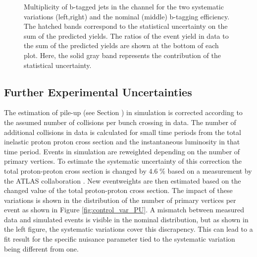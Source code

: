 \begin{figure}[htbp!]
\begin{center}
\caption{Multiplicity of b-tagged jets in the \emu channel for the two systematic variations (left,right) and the nominal (middle) b-tagging efficiency.
The hatched bands correspond to the statistical uncertainty on the sum of the predicted yields. 
        The ratios of the event yield in data to the sum of the predicted yields are
        shown at the bottom of each plot. Here, the solid gray band
        represents the contribution of the statistical uncertainty.
  \label{fig:control_var_BTAGH}}
  \end{center}
\end{figure}


\subsection{Further Experimental Uncertainties}

The estimation of pile-up (see Section ) in simulation is corrected according to the assumed number of collisions per bunch crossing in data. The number of additional collisions
in data is calculated for small time periods from the total inelastic proton proton cross section and the instantaneous luminosity in that time period.  
Events in simulation are reweighted depending on the number of primary vertices. To estimate the systematic uncertainty of this correction the total proton-proton cross section is changed
by $4.6 \; \%$ based on a measurement by the ATLAS collaboration \cite{Aaboud:2016mmw}. New eventweights are then estimated based on the changed value of the total proton-proton cross section.
The impact of these variations is shown in the distribution of the number of primary vertices per event as shown in Figure \ref{fig:control_var_PU}.
A mismatch between measured data and simulated events is visible in the nominal distribution, but as shown in the left figure, the systematic variations cover this discrapency.
This can lead to a fit result for the specific nuisance parameter tied to the systematic variation being different from one.

